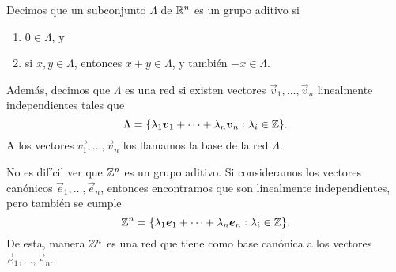 \begin{definition}
	Decimos que un subconjunto $\Lambda$ de $\mathbb{R}^n$ es un grupo aditivo si
	\begin{enumerate}
		\item $0 \in \Lambda$, y
		\item si $x, y \in \Lambda$, entonces $x + y \in \Lambda$, y también $-x \in \Lambda$.
	\end{enumerate}
	Además, decimos que $\Lambda$ es una red si existen vectores $\vec{v}_1, \ldots, \vec{v}_n$
	linealmente independientes tales que
	\begin{equation*}
		\Lambda = \lbrace \lambda_1\boldsymbol{v}_1 + \cdots + \lambda_n\boldsymbol{v}_n \vcentcolon \lambda_i \in
		\mathbb{Z} \rbrace.
	\end{equation*}
	A los vectores $\vec{v_1}, \ldots, \vec{v}_n$ los llamamos la base de la red $\Lambda$.
\end{definition}

\begin{example}
	No es difícil ver que $\mathbb{Z}^n$ es un grupo aditivo. Si consideramos los vectores canónicos
	$\vec{e}_1, \ldots, \vec{e}_n$, entonces encontramos que son linealmente independientes, pero
	también se cumple
	\begin{equation*}
		\mathbb{Z}^n = \lbrace \lambda_1\boldsymbol{e}_1 + \cdots + \lambda_n\boldsymbol{e}_n \vcentcolon \lambda_i \in
		\mathbb{Z} \rbrace.
	\end{equation*}
	De esta, manera $\mathbb{Z}^n$ es una red que tiene como base canónica a los vectores $\vec{e}_1,
	\ldots, \vec{e}_n$.
\end{example}

